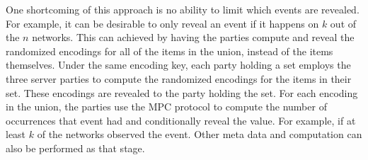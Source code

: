 One shortcoming of this approach is no ability to limit which events are revealed. For example, it can be desirable to only reveal an event if it happens on $k$ out of the $n$ networks. This can achieved by having the parties compute and reveal the randomized encodings for all of the items in the union, instead of the items themselves. Under the same encoding key, each party holding a set employs the three server parties to compute the randomized encodings for the items in their set. These encodings are revealed to the party holding the set. For each encoding in the union, the parties use the MPC protocol to compute the number of occurrences that event had and conditionally reveal the value. For example, if at least $k$ of the networks observed the event. Other meta data and computation can also be performed as that stage.













